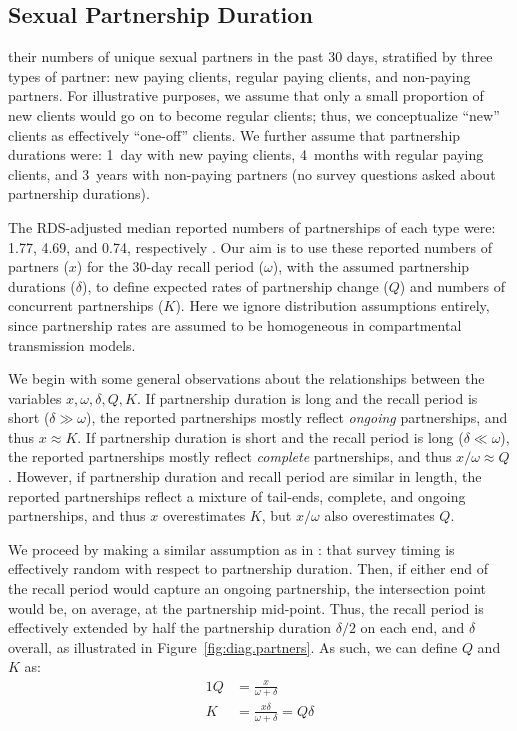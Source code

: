 \subsection{Sexual Partnership Duration}\label{meth.partners}
their numbers of unique sexual partners in the past 30 days,
stratified by three types of partner:
new paying clients, regular paying clients, and non-paying partners.
For illustrative purposes, we assume that
only a small proportion of new clients would go on to become regular clients;
thus, we conceptualize ``new'' clients as effectively ``one-off'' clients.
We further assume that partnership durations were:
1~day with new paying clients,
4~months with regular paying clients, and
3~years with non-paying partners
(no survey questions asked about partnership durations).
\par
The RDS-adjusted median reported numbers of partnerships of each type were:
1.77, 4.69, and 0.74, respectively \cite{Baral2014}.
Our aim is to use these reported numbers of partners ($x$)
for the 30-day recall period ($\omega$),
with the assumed partnership durations ($\delta$),
to define expected rates of partnership change ($Q$) and numbers of concurrent partnerships ($K$).
Here we ignore distribution assumptions entirely, since
partnership rates are assumed to be homogeneous in compartmental transmission models.
\par
We begin with some general observations about
the relationships between the variables $x, \omega, \delta, Q, K$.
If partnership duration is long and the recall period is short ($\delta \gg \omega$),
the reported partnerships mostly reflect \emph{ongoing} partnerships,
and thus $x \approx K$.
If partnership duration is short and the recall period is long ($\delta \ll \omega$),
the reported partnerships mostly reflect \emph{complete} partnerships,
and thus $x/\omega \approx Q$.
However, if partnership duration and recall period are similar in length,
the reported partnerships reflect a mixture of tail-ends, complete, and ongoing partnerships,
and thus $x$ overestimates $K$, but $x/\omega$ also overestimates $Q$.
\par
We proceed by making a similar assumption as in :
that survey timing is effectively random with respect to partnership duration.
Then, if either end of the recall period would capture an ongoing partnership,
the intersection point would be, on average, at the partnership mid-point.
Thus, the recall period is effectively extended
by half the partnership duration $\delta/2$ on each end, and $\delta$ overall,
as illustrated in Figure~\ref{fig:diag.partners}.
As such, we can define $Q$ and $K$ as:
\begin{alignat}{1}
  Q &= \frac{x}{\omega + \delta}\\
  K &= \frac{x \delta}{\omega + \delta} = Q \delta
\end{alignat}
